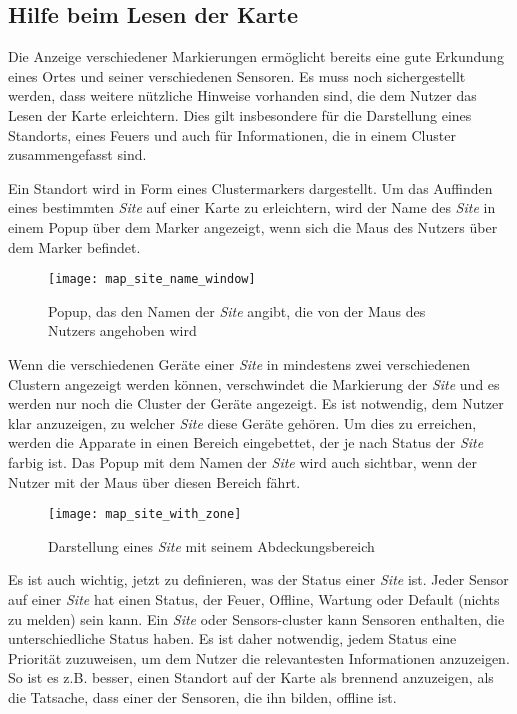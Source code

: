 \subsection{Hilfe beim Lesen der Karte} \label{sec:help_reading_map}

Die Anzeige verschiedener Markierungen ermöglicht bereits eine gute Erkundung eines Ortes und seiner verschiedenen Sensoren.
Es muss noch sichergestellt werden, dass weitere nützliche Hinweise vorhanden sind, die dem Nutzer das Lesen der Karte erleichtern.
Dies gilt insbesondere für die Darstellung eines Standorts, eines Feuers und auch für Informationen, die in einem Cluster zusammengefasst sind.

Ein Standort wird in Form eines Clustermarkers dargestellt.
Um das Auffinden eines bestimmten \textit{Site} auf einer Karte zu erleichtern, wird der Name des \textit{Site} in einem Popup über dem Marker angezeigt, wenn sich die Maus des Nutzers über dem Marker befindet.

\begin{figure}[H]
  \centering
  \texttt{[image: map\_site\_name\_window]}
  \caption{Popup, das den Namen der \textit{Site} angibt, die von der Maus des Nutzers angehoben wird}
  \label{fig:map_site_name_window}
\end{figure}

Wenn die verschiedenen Geräte einer \textit{Site} in mindestens zwei verschiedenen Clustern angezeigt werden können, verschwindet die Markierung der \textit{Site} und es werden nur noch die Cluster der Geräte angezeigt.
Es ist notwendig, dem Nutzer klar anzuzeigen, zu welcher \textit{Site} diese Geräte gehören.
Um dies zu erreichen, werden die Apparate in einen Bereich eingebettet, der je nach Status der \textit{Site} farbig ist.
Das Popup mit dem Namen der \textit{Site} wird auch sichtbar, wenn der Nutzer mit der Maus über diesen Bereich fährt.

\begin{figure}[H]
  \centering
  \texttt{[image: map\_site\_with\_zone]}
  \caption{Darstellung eines \textit{Site} mit seinem Abdeckungsbereich}
  \label{fig:map_site_with_zone}
\end{figure}

Es ist auch wichtig, jetzt zu definieren, was der Status einer \textit{Site} ist.
Jeder Sensor auf einer \textit{Site} hat einen Status, der Feuer, Offline, Wartung oder Default (nichts zu melden) sein kann.
Ein \textit{Site} oder Sensors-cluster kann Sensoren enthalten, die unterschiedliche Status haben.
Es ist daher notwendig, jedem Status eine Priorität zuzuweisen, um dem Nutzer die relevantesten Informationen anzuzeigen.
So ist es z.B. besser, einen Standort auf der Karte als brennend anzuzeigen, als die Tatsache, dass einer der Sensoren, die ihn bilden, offline ist.

